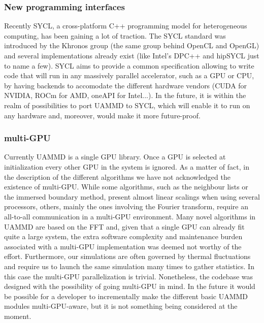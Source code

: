 \documentclass[twoside,openright,titlepage,numbers=noenddot,%
headinclude,footinclude,cleardoublepage=empty,abstract=on,
BCOR=5mm,fontsize=11pt, dvipsnames, paper=b5
]{scrreprt}
\begin{document}
\subsubsection*{New programming interfaces}
Recently SYCL, a cross-platform C++ programming model for heterogeneous computing, has been gaining a lot of traction. The SYCL standard was introduced by the Khronos group (the same group behind OpenCL and OpenGL) and several implementations already exist (like Intel's DPC++ and hipSYCL just to name a few). SYCL aims to provide a common specification allowing to write code that will run in any massively parallel accelerator, such as a GPU or CPU, by having backends to accomodate the different hardware vendors (CUDA for NVIDIA, ROCm for AMD, oneAPI for Intel...). In the future, it is within the realm of possibilities to port UAMMD to SYCL, which will enable it to run on any hardware and, moreover, would make it more future-proof.

\subsubsection*{multi-GPU}
Currently UAMMD is a single GPU library. Once a GPU is selected at initialization every other GPU in the system is ignored. As a matter of fact, in the description of the different algorithms we have not acknowledged the existence of multi-GPU. While some algorithms, such as the neighbour lists or the immersed boundary method, present almost linear scalings when using several processors, others, mainly the ones involving the Fourier transform, require an all-to-all communication in a multi-GPU environment. Many novel algorithms in UAMMD are based on the \gls{FFT} and, given that a single GPU can already fit quite a large system, the extra software complexity and maintenance burden associated with a multi-GPU implementation was deemed not worthy of the effort. Furthermore, our simulations are often governed by thermal fluctuations and require us to launch the same simulation many times to gather statistics. In this case the multi-GPU parallelization is trivial. Nonetheless, the codebase was designed with the possibility of going multi-GPU in mind. In the future it would be possible for a developer to incrementally make the different basic UAMMD modules multi-GPU-aware, but it is not something being considered at the moment.
\end{document}
